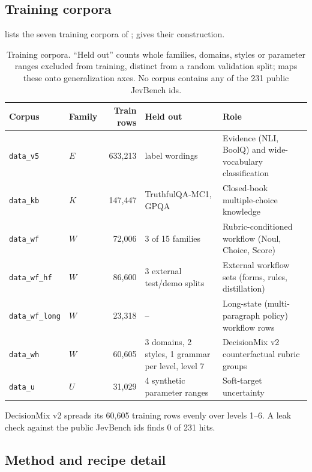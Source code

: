 \subsection{Training corpora}
\label{app:training-corpora}

 lists the seven training corpora of ;  gives their
construction.

\begin{table}[h]
  \centering
  \caption{Training corpora. ``Held out'' counts whole families, domains, styles or parameter ranges
  excluded from training, distinct from a random validation split;  maps
  these onto generalization axes. No corpus contains any of the 231 public JevBench ids.}
  \label{tab:corpora}
  \small
  \setlength{\tabcolsep}{4pt}
  \begin{tabular}{llrp{3.0cm}p{4.2cm}}
    \toprule
    Corpus & Family & Train rows & Held out & Role \\
    \midrule
    \texttt{data\_v5} & $E$ & 633{,}213 & label wordings & Evidence (NLI, BoolQ) and wide-vocabulary classification \\
    \texttt{data\_kb} & $K$ & 147{,}447 & TruthfulQA-MC1, GPQA & Closed-book multiple-choice knowledge \\
    \texttt{data\_wf} & $W$ & 72{,}006 & 3 of 15 families & Rubric-conditioned workflow (Noul, Choice, Score) \\
    \texttt{data\_wf\_hf} & $W$ & 86{,}600 & 3 external test/demo splits & External workflow sets (forms, rules, distillation) \\
    \texttt{data\_wf\_long} & $W$ & 23{,}318 & -- & Long-state (multi-paragraph policy) workflow rows \\
    \texttt{data\_wh} & $W$ & 60{,}605 & 3 domains, 2 styles, 1 grammar per level, level 7 & DecisionMix v2 counterfactual rubric groups \\
    \texttt{data\_u} & $U$ & 31{,}029 & 4 synthetic parameter ranges & Soft-target uncertainty \\
    \bottomrule
  \end{tabular}
\end{table}

DecisionMix v2 spreads its 60{,}605 training rows evenly over levels 1--6. A leak check against the public
JevBench ids finds 0 of 231 hits.

\subsection{Method and recipe detail}
\label{app:method-detail}

